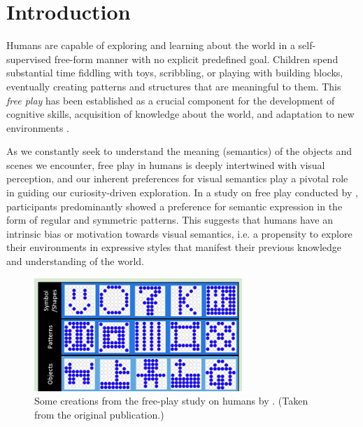 \chapter{Introduction}
\label{sec:introduction}

Humans are capable of exploring and learning about the world in a self-supervised free-form manner with no explicit predefined goal. 
Children spend substantial time fiddling with toys, scribbling, or playing with building blocks, eventually creating patterns and structures that are meaningful to them.
This \emph{free play} has been established as a crucial component for the development of cognitive skills, acquisition of knowledge about the world, and adaptation to new environments \citep{exploration,chu2020play}.


As we constantly seek to understand the meaning (semantics) of the objects and scenes we encounter, free play in humans is deeply intertwined with visual perception, and our inherent preferences for visual semantics play a pivotal role in guiding our curiosity-driven exploration.
In a study on free play conducted by \citet{diggs}, participants predominantly showed a preference for semantic expression in the form of regular and symmetric patterns.
This suggests that humans have an intrinsic bias or motivation towards visual semantics, i.e. a propensity to explore their environments in expressive styles that manifest their previous knowledge and understanding of the world.

\vspace{12pt}
\begin{figure}[h]
    \centering
    \includegraphics[width=0.7\textwidth]{images/diggs.png}
    \caption{Some creations from the free-play study on humans by \cite{diggs}. (Taken from the original publication.)}
    \label{fig:diggs}
\end{figure}
\vspace{12pt}

